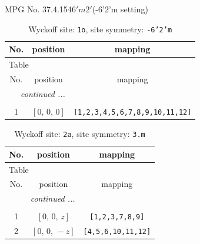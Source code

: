 \documentclass[fleqn,8pt]{jsarticle}
\begin{document}
\setcounter{MaxMatrixCols}{32}

\renewcommand{\tablename}{Table~}
\renewcommand{\figurename}{Figure~}
\begin{center}
\LARGE
MPG No. 37.4.154\quad$\bar{6}'m2'$\quad(-6'2'm setting)
\end{center}
\renewcommand{\arraystretch}{1.2}
\begin{longtable}{ccc}
\caption{Wyckoff site: {\tt 1o}, site symmetry: {\tt -6'2'm}}
 \\
 \hline \hline
No. & position & mapping \\ \hline \endfirsthead

\multicolumn{2}{l}{\tablename\ \thetable{}} \\
 \hline \hline
No. & position & mapping \\ \hline \endhead

 \hline \hline
\multicolumn{2}{r}{\footnotesize\it continued ...} \\ \endfoot

 \hline \hline
\multicolumn{2}{r}{} \\ \endlastfoot

1 & $\left[ 0,\, 0,\, 0 \right]$ & {\tt [1,2,3,4,5,6,7,8,9,10,11,12]} \\
\end{longtable}
\renewcommand{\arraystretch}{1.2}
\begin{longtable}{ccc}
\caption{Wyckoff site: {\tt 2a}, site symmetry: {\tt 3.m}}
 \\
 \hline \hline
No. & position & mapping \\ \hline \endfirsthead

\multicolumn{2}{l}{\tablename\ \thetable{}} \\
 \hline \hline
No. & position & mapping \\ \hline \endhead

 \hline \hline
\multicolumn{2}{r}{\footnotesize\it continued ...} \\ \endfoot

 \hline \hline
\multicolumn{2}{r}{} \\ \endlastfoot

1 & $\left[ 0,\, 0,\, z \right]$ & {\tt [1,2,3,7,8,9]} \\ \hline
2 & $\left[ 0,\, 0,\, - z \right]$ & {\tt [4,5,6,10,11,12]} \\
\end{longtable}
\renewcommand{\arraystretch}{1.2}
\end{document}
